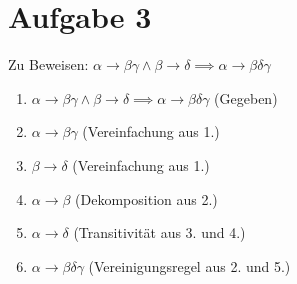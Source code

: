 \pagebreak
\section*{Aufgabe 3}
Zu Beweisen: $ \alpha \rightarrow \beta\gamma \land \beta \rightarrow \delta \implies \alpha \rightarrow  \beta\delta\gamma $
\begin{enumerate}
\item $ \alpha \rightarrow \beta\gamma \land \beta \rightarrow \delta \implies \alpha \rightarrow  \beta\delta\gamma $ \quad (Gegeben)
\item $ \alpha \rightarrow \beta\gamma $ \quad (Vereinfachung aus 1.)
\item $ \beta \rightarrow \delta $ \quad (Vereinfachung aus 1.)
\item $ \alpha \rightarrow \beta $ \quad (Dekomposition aus 2.)
\item $ \alpha \rightarrow \delta $ \quad (Transitivität aus 3. und 4.)
\item $ \alpha \rightarrow \beta\delta\gamma $ \quad (Vereinigungsregel aus 2. und 5.)
\end{enumerate}